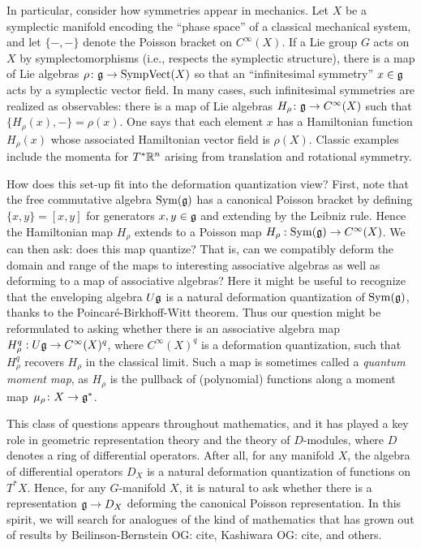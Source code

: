 \documentclass[11pt]{amsart}
\def\owen#1{{\textcolor{violet!65!black}{OG: {#1}}}}
\begin{document}
In particular, consider how symmetries appear in mechanics.
Let $X$ be a symplectic manifold encoding the ``phase space'' of a classical mechanical system,
and let $\{-,-\}$ denote the Poisson bracket on $C^\infty(X)$.
If a Lie group $G$ acts on $X$ by symplectomorphisms (i.e., respects the symplectic structure),
there is a map of Lie algebras $\rho \colon\mathfrak g \to {\rm SympVect}(X)$ so that an ``infinitesimal symmetry'' $x \in \mathfrak g$ acts by a symplectic vector field.
In many cases, such infinitesimal symmetries are realized as observables: 
there is a map of Lie algebras $H_\rho \colon \mathfrak g \to C^\infty(X)$ such that $\{ H_\rho(x), - \} = \rho(x)$.
One says that each element $x$ has a Hamiltonian function $H_\rho(x)$ whose associated Hamiltonian vector field is $\rho(X)$.
Classic examples include the momenta for $T^* \mathbb R^n$ arising from translation and rotational symmetry.

How does this set-up fit into the deformation quantization view?
First, note that the free commutative algebra $\operatorname{Sym}(\mathfrak g)$ has a canonical Poisson bracket by defining $ \{x, y \}   = [x, y]$ for generators $x, y \in \mathfrak g$ and extending by the Leibniz rule.
Hence the Hamiltonian map $H_\rho$ extends to a Poisson map $H_\rho: \operatorname{Sym}(\mathfrak g) \to C^\infty(X)$.
We can then ask: does this map quantize? That is, can we compatibly deform the domain and range of the maps to interesting associative algebras as well as deforming to a map of associative algebras?
Here it might be useful to recognize that the enveloping algebra $U\mathfrak g$ is a natural deformation quantization of $\operatorname{Sym}(\mathfrak g)$, thanks to the Poincar\'e-Birkhoff-Witt theorem.
Thus our question might be reformulated to asking whether there is an associative algebra map $H^q_\rho: U\mathfrak g \to C^\infty(X)^q$, where $C^\infty(X)^q$ is a deformation quantization, such that $H^q_\rho$ recovers $H_\rho$ in the classical limit.
Such a map is sometimes called a {\em quantum moment map},
as $H_\rho$ is the pullback of (polynomial) functions along a moment map~$\mu_\rho \colon X \to \mathfrak g^*$.

This class of questions appears throughout mathematics,
and it has played a key role in geometric representation theory and the theory of $D$-modules, where $D$ denotes a ring of differential operators.
After all, for any manifold $X$, the algebra of differential operators $D_X$ is a natural deformation quantization of functions on $T^* X$.
Hence, for any $G$-manifold $X$, it is natural to ask whether there is a representation $\mathfrak g \to D_X$ deforming the canonical Poisson representation.
In this spirit, we will search for analogues of the kind of mathematics that has grown out of results by Beilinson-Bernstein \owen{cite}, Kashiwara \owen{cite}, and others.
\end{document}
